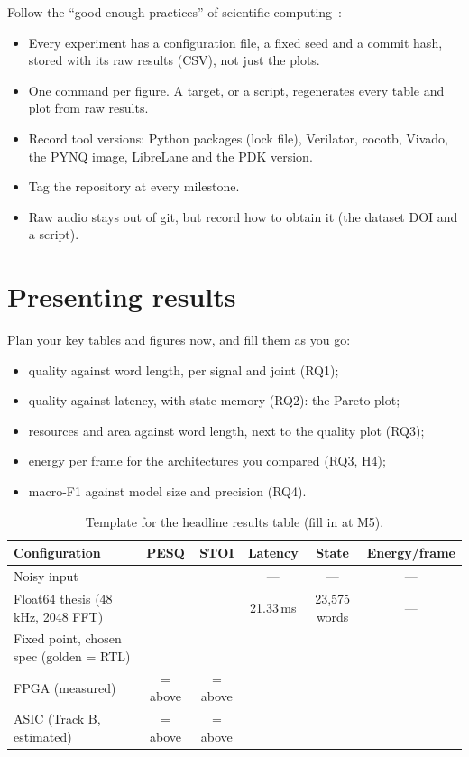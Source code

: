 Follow the \enquote{good enough practices} of scientific
computing~\cite{ch12-13:wilson2017goodenough,ch12-13:sandve2013tenrules}:
\begin{itemize}
  \item Every experiment has a configuration file, a fixed seed and a commit
        hash, stored with its raw results (CSV), not just the plots.
  \item One command per figure. A  target, or a script,
        regenerates every table and plot from raw results.
  \item Record tool versions: Python packages (lock file), Verilator, cocotb,
        Vivado, the PYNQ image, LibreLane and the PDK version.
  \item Tag the repository at every milestone.
  \item Raw audio stays out of git, but record how to obtain it (the dataset DOI
        and a script).
\end{itemize}

\section{Presenting results}\label{sec:eval:present}

Plan your key tables and figures now, and fill them as you go:
\begin{itemize}
  \item quality against word length, per signal and joint (RQ1);
  \item quality against latency, with state memory (RQ2): the Pareto plot;
  \item resources and area against word length, next to the quality plot (RQ3);
  \item energy per frame for the architectures you compared (RQ3, H4);
  \item macro-F1 against model size and precision (RQ4).
\end{itemize}

\begin{table}[htbp]
\centering\footnotesize
\caption{Template for the headline results table (fill in at M5).}
\label{tab:eval:headline}
\begin{tabularx}{\textwidth}{@{}LCCCCC@{}}
\toprule
Configuration & PESQ & STOI & Latency & State & Energy/frame \\
\midrule
Noisy input & & & --- & --- & --- \\
Float64 thesis (48\,kHz, 2048 FFT) & & & 21.33\,ms & 23,575 words & --- \\
Fixed point, chosen spec (golden = RTL) & & & & & \\
FPGA (measured) & = above & = above & & & \\
ASIC (Track B, estimated) & = above & = above & & & \\
\bottomrule
\end{tabularx}
\end{table}

